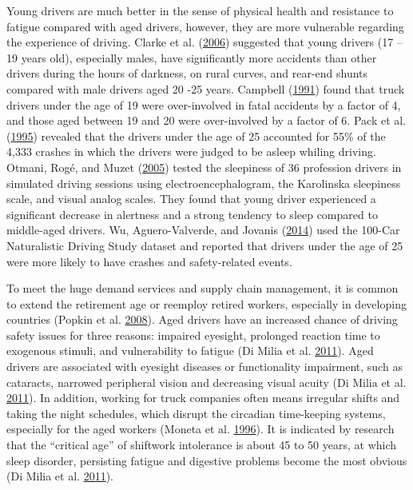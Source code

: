 \documentclass[12pt]{book}
\numberwithin{equation}{chapter}
\begin{document}
Young drivers are much better in the sense of physical health and resistance to fatigue compared with aged drivers, however, they are more vulnerable regarding the experience of driving. Clarke et al. (\protect\hyperlink{ref-clarke2006young}{2006}) suggested that young drivers (17 -- 19 years old), especially males, have significantly more accidents than other drivers during the hours of darkness, on rural curves, and rear-end shunts compared with male drivers aged 20 -25 years. Campbell (\protect\hyperlink{ref-campbell1991fatal}{1991}) found that truck drivers under the age of 19 were over-involved in fatal accidents by a factor of 4, and those aged between 19 and 20 were over-involved by a factor of 6. Pack et al. (\protect\hyperlink{ref-pack1995characteristics}{1995}) revealed that the drivers under the age of 25 accounted for 55\% of the 4,333 crashes in which the drivers were judged to be asleep whiling driving. Otmani, Rogé, and Muzet (\protect\hyperlink{ref-otmani2005sleepiness}{2005}) tested the sleepiness of 36 profession drivers in simulated driving sessions using electroencephalogram, the Karolinska sleepiness scale, and visual analog scales. They found that young driver experienced a significant decrease in alertness and a strong tendency to sleep compared to middle-aged drivers. Wu, Aguero-Valverde, and Jovanis (\protect\hyperlink{ref-wu2014using}{2014}) used the 100-Car Naturalistic Driving Study dataset and reported that drivers under the age of 25 were more likely to have crashes and safety-related events.

To meet the huge demand services and supply chain management, it is common to extend the retirement age or reemploy retired workers, especially in developing countries (Popkin et al. \protect\hyperlink{ref-popkin2008age}{2008}). Aged drivers have an increased chance of driving safety issues for three reasons: impaired eyesight, prolonged reaction time to exogenous stimuli, and vulnerability to fatigue (Di Milia et al. \protect\hyperlink{ref-di2011demographic}{2011}). Aged drivers are associated with eyesight diseases or functionality impairment, such as cataracts, narrowed peripheral vision and decreasing visual acuity (Di Milia et al. \protect\hyperlink{ref-di2011demographic}{2011}). In addition, working for truck companies often means irregular shifts and taking the night schedules, which disrupt the circadian time-keeping systems, especially for the aged workers (Moneta et al. \protect\hyperlink{ref-moneta1996time}{1996}). It is indicated by research that the ``critical age'' of shiftwork intolerance is about 45 to 50 years, at which sleep disorder, persisting fatigue and digestive problems become the most obvious (Di Milia et al. \protect\hyperlink{ref-di2011demographic}{2011}).
\end{document}
